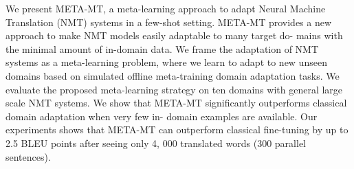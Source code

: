 We present META-MT, a meta-learning approach to adapt Neural Machine Translation (NMT) systems in a few-shot setting. META-MT provides a new approach to make NMT models easily adaptable to many target do- mains with the minimal amount of in-domain data. We frame the adaptation of NMT systems as a meta-learning problem, where we learn to adapt to new unseen domains based on simulated offline meta-training domain adaptation tasks. We evaluate the proposed meta-learning strategy on ten domains with general large scale NMT systems. We show that META-MT significantly outperforms classical domain adaptation when very few in- domain examples are available. Our experiments shows that META-MT can outperform classical fine-tuning by up to 2.5 BLEU points after seeing only 4, 000 translated words (300 parallel sentences).
